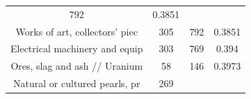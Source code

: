 \documentclass[10pt,]{article}
\begin{document}
\begin{longtable}[]{@{}cccc@{}}
\begin{minipage}[t]{0.20\columnwidth}
792\strut
\end{minipage} & \begin{minipage}[t]{0.09\columnwidth}\centering\strut
0.3851\strut
\end{minipage}\tabularnewline
\begin{minipage}[t]{0.38\columnwidth}\centering\strut
Works of art, collectors' piec\strut
\end{minipage} & \begin{minipage}[t]{0.21\columnwidth}\centering\strut
305\strut
\end{minipage} & \begin{minipage}[t]{0.20\columnwidth}\centering\strut
792\strut
\end{minipage} & \begin{minipage}[t]{0.09\columnwidth}\centering\strut
0.3851\strut
\end{minipage}\tabularnewline
\begin{minipage}[t]{0.38\columnwidth}\centering\strut
Electrical machinery and equip\strut
\end{minipage} & \begin{minipage}[t]{0.21\columnwidth}\centering\strut
303\strut
\end{minipage} & \begin{minipage}[t]{0.20\columnwidth}\centering\strut
769\strut
\end{minipage} & \begin{minipage}[t]{0.09\columnwidth}\centering\strut
0.394\strut
\end{minipage}\tabularnewline
\begin{minipage}[t]{0.38\columnwidth}\centering\strut
Ores, slag and ash // Uranium\strut
\end{minipage} & \begin{minipage}[t]{0.21\columnwidth}\centering\strut
58\strut
\end{minipage} & \begin{minipage}[t]{0.20\columnwidth}\centering\strut
146\strut
\end{minipage} & \begin{minipage}[t]{0.09\columnwidth}\centering\strut
0.3973\strut
\end{minipage}\tabularnewline
\begin{minipage}[t]{0.38\columnwidth}\centering\strut
Natural or cultured pearls, pr\strut
\end{minipage} & \begin{minipage}[t]{0.21\columnwidth}\centering\strut
269\strut
\end{minipage} & \begin{minipage}[t]{0.20\columnwidth}\centering\strut

\end{minipage}
\end{longtable}
\end{document}
